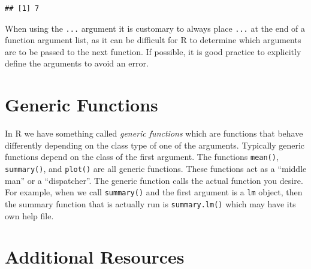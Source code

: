 \documentclass[
]{book}
\begin{document}
\begin{verbatim}
## [1] 7
\end{verbatim}

When using the \texttt{...} argument it is customary to always place \texttt{...} at the end of a function argument list, as it can be difficult for R to determine which arguments are to be passed to the next function. If possible, it is good practice to explicitly define the arguments to avoid an error.

\hypertarget{generic-functions}{%
\section{Generic Functions}\label{generic-functions}}

In R we have something called \emph{generic functions} which are functions that behave differently depending on the class type of one of the arguments. Typically generic functions depend on the class of the first argument. The functions \texttt{mean()}, \texttt{summary()}, and \texttt{plot()} are all generic functions. These functions act as a ``middle man'' or a ``dispatcher''. The generic function calls the actual function you desire. For example, when we call \texttt{summary()} and the first argument is a \texttt{lm} object, then the summary function that is actually run is \texttt{summary.lm()} which may have its own help file.

\hypertarget{additional-resources-3}{%
\section*{Additional Resources}\label{additional-resources-3}}
\end{document}
